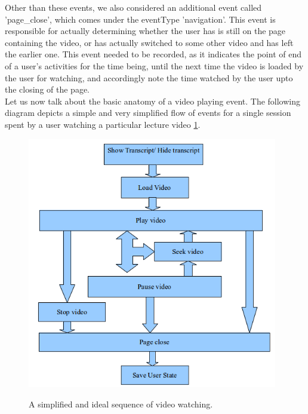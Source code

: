 \documentclass[16pt]{report}
\begin{document}
Other than these events, we also considered an additional event called 'page\_close', which comes under the eventType 'navigation'. This event is responsible for actually determining whether the user has is still on the page containing the video, or has actually switched to some other video and has left the earlier one. This event needed to be recorded, as it indicates the point of end of a user's activities for the time being, until the next time the video is loaded by the user for watching, and accordingly note the time watched by the user upto the closing of the page. \\ 

Let us now talk about the basic anatomy of a video playing event. The following diagram depicts a simple and very simplified flow of events for a single session spent by a user watching a particular lecture video \ref{fig:Image3}.\\
\begin{figure}
\centering
\includegraphics[height=11cm]{Diag3.png}\\ %
\caption{A simplified and ideal sequence of video watching. \label{fig:Image3} }
\end{figure}
\end{document}
